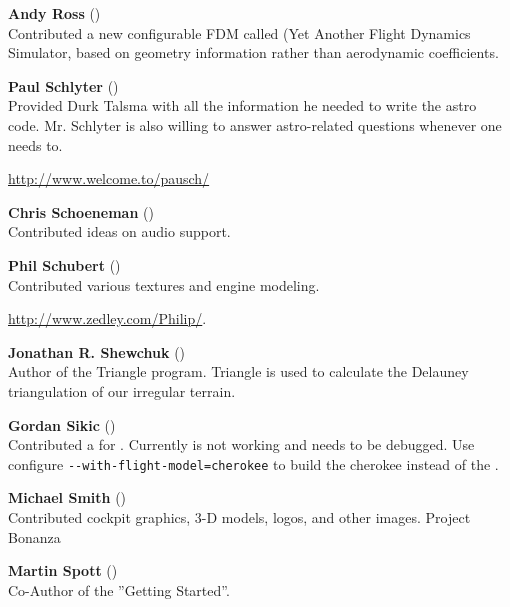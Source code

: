 \noindent \textbf{Andy Ross} ()\\
 Contributed a new configurable FDM called \YASim{} (Yet Another Flight Dynamics Simulator, based on geometry information rather than aerodynamic coefficients.
 \medskip

\noindent \textbf{Paul Schlyter} ()\\
  Provided Durk Talsma with all the information he needed to write the
  astro code. Mr. Schlyter is also willing to answer astro-related questions
  whenever one needs to.
  \medskip
  
  \href{http://www.welcome.to/pausch/}{http://www.welcome.to/pausch/}
 \medskip

\noindent \textbf{Chris Schoeneman}
()\\
  Contributed ideas on audio support.
 \medskip

\noindent \textbf{Phil Schubert} ()\\
  Contributed various textures and engine modeling.
   \medskip

  \href{http://www.zedley.com/Philip/}{http://www.zedley.com/Philip/}.
  \medskip

 \noindent \textbf{Jonathan R. Shewchuk}
()\\
  Author of the Triangle program.  Triangle
  is used to calculate the  Delauney triangulation of our irregular terrain.
 \medskip

\noindent \textbf{Gordan Sikic} ()\\
  Contributed a  for .  Currently is not
  working and needs to be debugged.  Use configure
  \texttt{-$ $-with-flight-model=cherokee}
  to build the cherokee instead of the .
 \medskip

\noindent \textbf{Michael Smith} ()\\
  Contributed cockpit graphics, 3-D models, logos, and other images.
  Project Bonanza
   \medskip

\noindent \textbf{Martin Spott} ()\\
  Co-Author of the ''Getting Started''.
  \medskip

